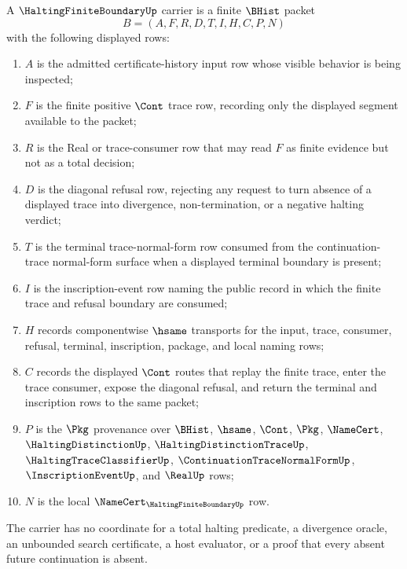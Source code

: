 \begin{definition}
\label{def:halting-finite-boundary-carrier}
A $\HaltingFiniteBoundaryUp$ carrier is a finite $\BHist$ packet
$$
B=(A,F,R,D,T,I,H,C,P,N)
$$
with the following displayed rows:
\begin{enumerate}
\item $A$ is the admitted certificate-history input row whose visible behavior is being inspected;
\item $F$ is the finite positive $\Cont$ trace row, recording only the displayed segment available to the packet;
\item $R$ is the Real or trace-consumer row that may read $F$ as finite evidence but not as a total decision;
\item $D$ is the diagonal refusal row, rejecting any request to turn absence of a displayed trace into divergence, non-termination, or a negative halting verdict;
\item $T$ is the terminal trace-normal-form row consumed from the continuation-trace normal-form surface when a displayed terminal boundary is present;
\item $I$ is the inscription-event row naming the public record in which the finite trace and refusal boundary are consumed;
\item $H$ records componentwise $\hsame$ transports for the input, trace, consumer, refusal, terminal, inscription, package, and local naming rows;
\item $C$ records the displayed $\Cont$ routes that replay the finite trace, enter the trace consumer, expose the diagonal refusal, and return the terminal and inscription rows to the same packet;
\item $P$ is the $\Pkg$ provenance over $\BHist$, $\hsame$, $\Cont$, $\Pkg$, $\NameCert$, $\HaltingDistinctionUp$, $\HaltingDistinctionTraceUp$, $\HaltingTraceClassifierUp$, $\ContinuationTraceNormalFormUp$, $\InscriptionEventUp$, and $\RealUp$ rows;
\item $N$ is the local $\NameCert_{\HaltingFiniteBoundaryUp}$ row.
\end{enumerate}
The carrier has no coordinate for a total halting predicate, a divergence oracle, an unbounded search certificate, a host evaluator, or a proof that every absent future continuation is absent.
\end{definition}

